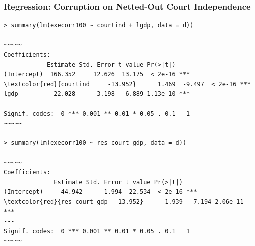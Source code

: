 \documentclass[xcolor=svgnames,9pt,english,aspectratio=169,t]{beamer}
\begin{document}
\begin{frame}[fragile]
\frametitle{Regression: Corruption on Netted-Out Court Independence}
\begin{Verbatim}[fontsize=\footnotesize, frame=single, label=R Code, commandchars=\\\{\}]
> summary(lm(execorr100 ~ courtind + lgdp, data = d))

~~~~~
Coefficients:
            Estimate Std. Error t value Pr(>|t|)
(Intercept)  166.352     12.626  13.175  < 2e-16 ***
\textcolor{red}{courtind     -13.952}      1.469  -9.497  < 2e-16 ***
lgdp         -22.028      3.198  -6.889 1.13e-10 ***
---
Signif. codes:  0 *** 0.001 ** 0.01 * 0.05 . 0.1   1
~~~~~

> summary(lm(execorr100 ~ res_court_gdp, data = d))

~~~~~
Coefficients:
              Estimate Std. Error t value Pr(>|t|)
(Intercept)     44.942      1.994  22.534  < 2e-16 ***
\textcolor{red}{res_court_gdp  -13.952}      1.939  -7.194 2.06e-11 ***
---
Signif. codes:  0 *** 0.001 ** 0.01 * 0.05 . 0.1   1
~~~~~
\end{Verbatim}
\end{frame}


%
%
%
%
%
%
%
%
%
%
%

%
\end{document}
